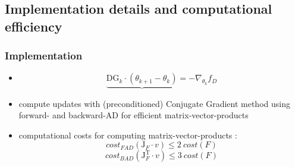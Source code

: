 \subsection{Implementation details and computational efficiency}
\begin{frame}
\frametitle{Implementation}
\begin{itemize}
	\item[] $$\underbrace{\mathrm{DG}_{k}\cdot (\theta_{k+1} - \theta_{k})} = -\nabla_{\theta_{k}}f_{D}$$
	\item compute updates with (preconditioned) Conjugate Gradient method using forward- and backward-AD for efficient matrix-vector-products
	\pause
	\item computational costs for computing matrix-vector-products :
	$$cost_{FAD}(\mathrm{J}_{F}\cdot v)\leq 2\:cost(F)$$
	$$cost_{BAD}(\mathrm{J}_{F}^{\mathrm{T}}\cdot v)\leq 3\:cost(F)$$
\end{itemize}
\end{frame}
  

